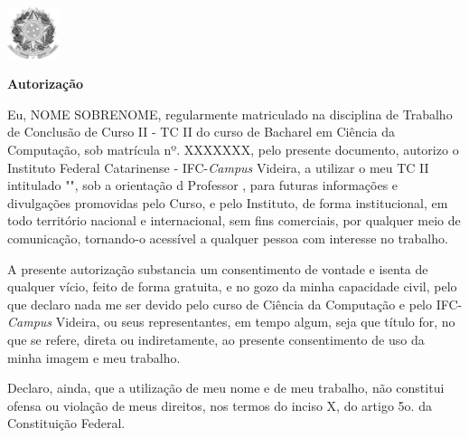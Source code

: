 \begin{folhadeautorizacao}

  \begin{center}
  \vspace*{1 cm}
  \vspace{-2cm}
   \centering\includegraphics[width=1.5cm]{figuras/brasaoRepublicaPeB.jpg}
   \vspace{-0.5 cm}
    {\large \SingleSpacing \imprimirinstituicao}
    \vspace{-0.5cm}
    \center{ \hrulefill}
    
     {\large \SingleSpacing \textbf{Autorização}}
    
    
    \vspace*{1 cm}
    
    \vspace*{0.5 cm}
    
   \end{center}
   


Eu, NOME SOBRENOME, regularmente matriculado na disciplina de Trabalho de Conclusão de Curso II - TC II do curso de Bacharel em Ciência da Computação, sob matrícula nº. XXXXXXX, pelo presente documento, autorizo o Instituto Federal Catarinense - IFC-\textit{Campus} Videira, a utilizar o meu TC II intitulado "\imprimirtitulo", sob a orientação d Professor \imprimirorientador, para futuras informações e divulgações promovidas pelo Curso, e pelo Instituto, de forma institucional, em todo território nacional e internacional, sem fins comerciais, por qualquer meio de comunicação, tornando-o acessível a qualquer pessoa com interesse no trabalho.

A presente autorização substancia um consentimento de vontade e isenta de qualquer vício, feito de forma gratuita, e no gozo da minha capacidade civil, pelo que declaro nada me ser devido pelo curso de Ciência da Computação e pelo IFC-\textit{Campus} Videira, ou seus representantes, em tempo algum, seja que título for, no que se refere, direta ou indiretamente, ao presente consentimento de uso da minha imagem e meu trabalho.

Declaro, ainda, que a utilização de meu nome e de meu trabalho, não constitui ofensa ou violação de meus direitos, nos termos do inciso X, do artigo 5o. da Constituição Federal.


\end{folhadeautorizacao}
